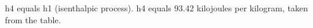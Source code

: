 h4 equals h1 (isenthalpic process).  
h4 equals 93.42 kilojoules per kilogram, taken from the table.